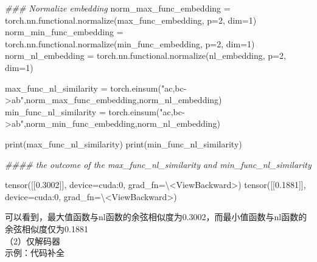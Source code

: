 \documentclass[
]{article}
\newenvironment{Shaded}{}{}
\newcommand{\BuiltInTok}[1]{\textcolor[rgb]{0.00,0.50,0.00}{#1}}
\newcommand{\CommentTok}[1]{\textcolor[rgb]{0.38,0.63,0.69}{\textit{#1}}}
\newcommand{\DecValTok}[1]{\textcolor[rgb]{0.25,0.63,0.44}{#1}}
\newcommand{\FloatTok}[1]{\textcolor[rgb]{0.25,0.63,0.44}{#1}}
\newcommand{\NormalTok}[1]{#1}
\newcommand{\OperatorTok}[1]{\textcolor[rgb]{0.40,0.40,0.40}{#1}}
\newcommand{\StringTok}[1]{\textcolor[rgb]{0.25,0.44,0.63}{#1}}
\begin{document}
\begin{Shaded}
  \begin{Highlighting}[]
    \CommentTok{\#\#\# Normalize embedding}
    \NormalTok{norm\_max\_func\_embedding }\OperatorTok{=}\NormalTok{ torch.nn.functional.normalize(max\_func\_embedding, p}\OperatorTok{=}\DecValTok{2}\NormalTok{, dim}\OperatorTok{=}\DecValTok{1}\NormalTok{)}
    \NormalTok{norm\_min\_func\_embedding }\OperatorTok{=}\NormalTok{ torch.nn.functional.normalize(min\_func\_embedding, p}\OperatorTok{=}\DecValTok{2}\NormalTok{, dim}\OperatorTok{=}\DecValTok{1}\NormalTok{)}
    \NormalTok{norm\_nl\_embedding }\OperatorTok{=}\NormalTok{ torch.nn.functional.normalize(nl\_embedding, p}\OperatorTok{=}\DecValTok{2}\NormalTok{, dim}\OperatorTok{=}\DecValTok{1}\NormalTok{)}

    \NormalTok{max\_func\_nl\_similarity }\OperatorTok{=}\NormalTok{ torch.einsum(}\StringTok{"ac,bc{-}\textgreater{}ab"}\NormalTok{,norm\_max\_func\_embedding,norm\_nl\_embedding)}
    \NormalTok{min\_func\_nl\_similarity }\OperatorTok{=}\NormalTok{ torch.einsum(}\StringTok{"ac,bc{-}\textgreater{}ab"}\NormalTok{,norm\_min\_func\_embedding,norm\_nl\_embedding)}

    \BuiltInTok{print}\NormalTok{(max\_func\_nl\_similarity)}
    \BuiltInTok{print}\NormalTok{(min\_func\_nl\_similarity)}

    \CommentTok{\#\#\#\# the outcome of the max\_func\_nl\_similarity and min\_func\_nl\_similarity}

    \NormalTok{tensor([[}\FloatTok{0.3002}\NormalTok{]], device}\OperatorTok{=}\StringTok{\textquotesingle{}cuda:0\textquotesingle{}}\NormalTok{, grad\_fn}\OperatorTok{=}\NormalTok{\textbackslash{}}\OperatorTok{\textless{}}\NormalTok{ViewBackward}\OperatorTok{\textgreater{}}\NormalTok{)}
    \NormalTok{tensor([[}\FloatTok{0.1881}\NormalTok{]], device}\OperatorTok{=}\StringTok{\textquotesingle{}cuda:0\textquotesingle{}}\NormalTok{, grad\_fn}\OperatorTok{=}\NormalTok{\textbackslash{}}\OperatorTok{\textless{}}\NormalTok{ViewBackward}\OperatorTok{\textgreater{}}\NormalTok{)}
  \end{Highlighting}
\end{Shaded}

可以看到，最大值函数与nl函数的余弦相似度为0.3002，而最小值函数与nl函数的余弦相似度仅为0.1881\\
（2）仅解码器\\
示例：代码补全
\end{document}
